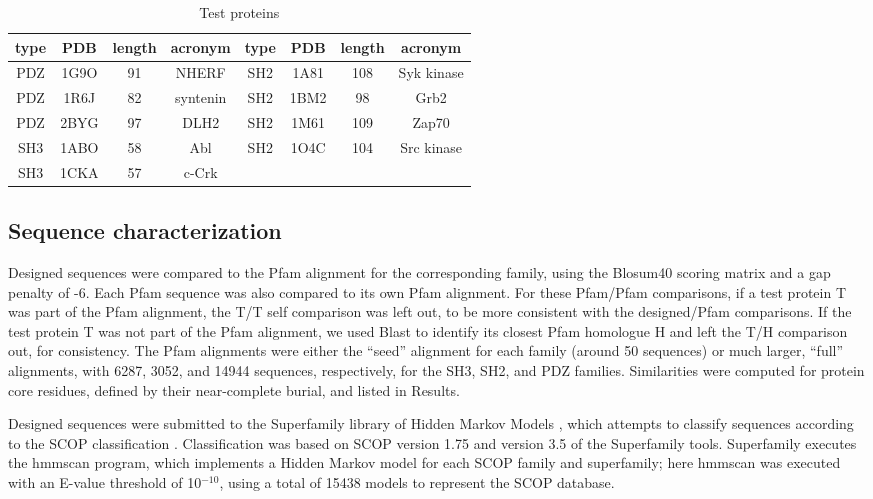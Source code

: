 \begin{table}[H]                            
\caption{Test proteins}
\label{tab:proteins}                      
\begin{center}
\begin{tabular}{cccccccc} \hline \hline  
type & PDB  & length & acronym  & type & PDB  & length & acronym \\ \hline
PDZ  & 1G9O &  91    & NHERF    & SH2  & 1A81 & 108    & Syk kinase \\ 
PDZ  & 1R6J &  82    & syntenin & SH2  & 1BM2 &  98    & Grb2       \\
PDZ  & 2BYG &  97    & DLH2     & SH2  & 1M61 & 109    & Zap70      \\
SH3  & 1ABO &  58    & Abl      & SH2  & 1O4C & 104    & Src kinase \\
SH3  & 1CKA &  57    & c-Crk    &      &      &        &     \\ \hline
\end{tabular}
\end{center}
\end{table}




\subsection{Sequence characterization}
Designed sequences were compared to the Pfam alignment for the corresponding family, using the Blosum40 scoring
matrix and a gap penalty of -6. Each Pfam sequence was also compared to its own Pfam alignment. For these Pfam/Pfam
comparisons, if a test protein T was part of the Pfam alignment, the T/T self comparison was left out, to be more
consistent with the designed/Pfam comparisons. If the test protein T was not part of the Pfam alignment, we used
Blast to identify its closest Pfam homologue H and left the T/H comparison out, for consistency. The Pfam alignments
were either the ``seed'' alignment for each family (around 50 sequences) or much larger, ``full'' alignments, with
6287, 3052, and 14944 sequences, respectively, for the SH3, SH2, and PDZ families. Similarities were computed for
protein core residues, defined by their near-complete burial, and listed in Results.

Designed sequences were submitted to the Superfamily library of Hidden Markov Models \cite{Gough01,Wilson07},
which attempts to classify sequences according to the SCOP classification \cite{Andreeva04}. Classification
was based on SCOP version 1.75 and version 3.5 of the Superfamily tools. Superfamily executes the hmmscan
program, which implements a Hidden Markov model for each SCOP family and superfamily; here hmmscan was executed
with an E-value threshold of 10$^{-10}$, using a total of 15438 models to represent the SCOP database.

